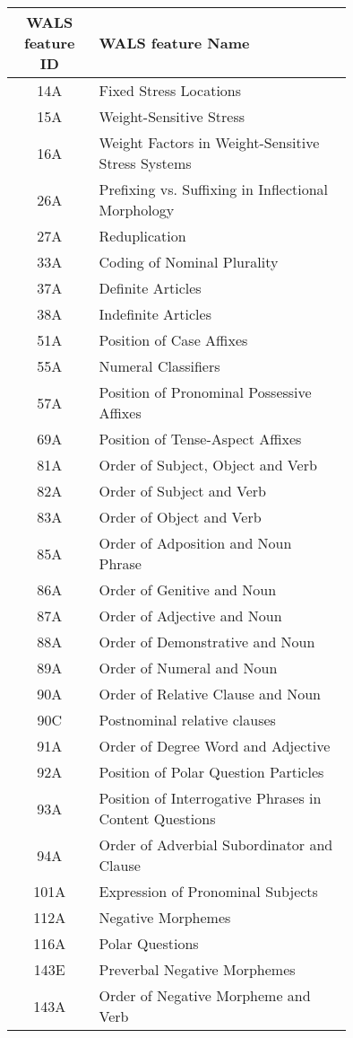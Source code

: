 \begin{tabular}{|c|p{0.75\linewidth}|}
	\hline
	WALS feature ID & WALS feature Name  \\ \hline 
14A & Fixed Stress Locations \\
15A & Weight-Sensitive Stress \\
16A & Weight Factors in Weight-Sensitive Stress Systems \\
26A & Prefixing vs. Suffixing in Inflectional Morphology \\
27A & Reduplication \\
33A & Coding of Nominal Plurality \\
37A & Definite Articles \\
38A & Indefinite Articles \\
51A & Position of Case Affixes \\
55A & Numeral Classifiers \\
57A & Position of Pronominal Possessive Affixes \\
69A & Position of Tense-Aspect Affixes \\
81A & Order of Subject, Object and Verb \\
82A & Order of Subject and Verb \\
83A & Order of Object and Verb \\
85A & Order of Adposition and Noun Phrase \\
86A & Order of Genitive and Noun \\
87A & Order of Adjective and Noun \\
88A & Order of Demonstrative and Noun \\
89A & Order of Numeral and Noun \\
90A & Order of Relative Clause and Noun \\
90C & Postnominal relative clauses \\
91A & Order of Degree Word and Adjective \\
92A & Position of Polar Question Particles \\
93A & Position of Interrogative Phrases in Content Questions \\
94A & Order of Adverbial Subordinator and Clause \\
101A & Expression of Pronominal Subjects \\
112A & Negative Morphemes \\
116A & Polar Questions \\
143E & Preverbal Negative Morphemes \\
143A & Order of Negative Morpheme and Verb \\

\end{tabular}
